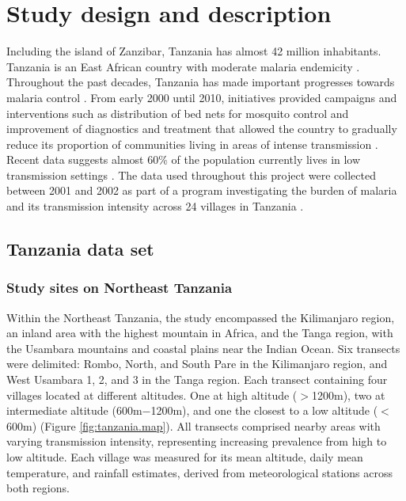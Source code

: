 \chapter{Study design and description}
\label{ch:2.0}

Including the island of Zanzibar, Tanzania has almost 42 million inhabitants.
Tanzania is an East African country with moderate malaria endemicity \cite{sicuri2013economic}.
Throughout the past decades, Tanzania has made important progresses towards malaria control \cite{worldbank2017}.
From early 2000 until 2010, initiatives provided campaigns and interventions such as distribution of bed nets for mosquito control and improvement of diagnostics and treatment that allowed the country to gradually reduce its proportion of communities living in areas of intense transmission \cite{world2013epidemiological}.
Recent data suggests almost 60\% of the population currently lives in low transmission settings \cite{world2013epidemiological}.
The data used throughout this project were collected between 2001 and 2002 as part of a program investigating the burden of malaria and its transmission intensity across 24 villages in Tanzania \cite{drakeley2005altitude}.

\section{Tanzania data set}

\subsection{Study sites on Northeast Tanzania}

Within the Northeast Tanzania, the study encompassed the Kilimanjaro region, an inland area with the highest mountain in Africa, and the Tanga region, with the Usambara mountains and coastal plains near the Indian Ocean.
Six transects were delimited: Rombo, North, and South Pare in the Kilimanjaro region, and West Usambara 1, 2, and 3 in the Tanga region.
Each transect containing four villages located at different altitudes. One at high altitude ($>$1200m), two at intermediate altitude (600m$-$1200m), and one the closest to a low altitude ($<$600m) (Figure \ref{fig:tanzania.map}).
All transects comprised nearby areas with varying transmission intensity, representing increasing prevalence from high to low altitude.
Each village was measured for its mean altitude, daily mean temperature, and rainfall estimates, derived from meteorological stations across both regions.
\vfill


